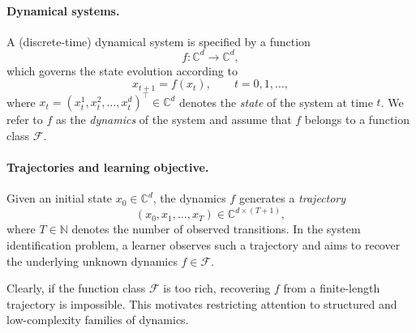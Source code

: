 \documentclass[11pt]{article}
\theoremstyle{plain}
\theoremstyle{definition}
\theoremstyle{remark}
\begin{document}

 
\paragraph{Dynamical systems.}
A (discrete-time) dynamical system is specified by a function
\[
f:\mathbb C^d\to\mathbb C^d,
\]
which governs the state evolution according to
\begin{equation}
    x_{t+1}=f(x_t), \qquad t=0,1,\ldots,
\end{equation}
where \(x_t=(x_t^1,x_t^2,\ldots,x_t^d)^\top\in\mathbb C^d\) denotes the \emph{state} of the system at time \(t\).
We refer to \(f\) as the \emph{dynamics} of the system and assume that \(f\) belongs to a function class \(\mathcal F\).

\paragraph{Trajectories and learning objective.}
Given an initial state \(x_0\in\mathbb C^d\), the dynamics \(f\) generates a \emph{trajectory}
\[
(x_0,x_1,\ldots,x_T)\in\mathbb C^{d\times (T+1)},
\]
where \(T\in\mathbb N\) denotes the number of observed transitions.
In the system identification problem, a learner observes such a trajectory and aims to recover the underlying unknown dynamics \(f\in\mathcal F\).

Clearly, if the function class \(\mathcal F\) is too rich, recovering \(f\) from a finite-length trajectory is impossible. This motivates restricting attention to structured and low-complexity families of dynamics.




\end{document}

